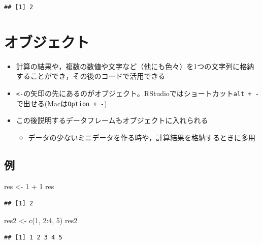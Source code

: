 \documentclass[
  xelatex,ja=standard, b5paper]{bxjsbook}
\newenvironment{Shaded}{\begin{snugshade}}{\end{snugshade}}
\newcommand{\DecValTok}[1]{\textcolor[rgb]{0.00,0.00,0.81}{#1}}
\newcommand{\FunctionTok}[1]{\textcolor[rgb]{0.00,0.00,0.00}{#1}}
\newcommand{\NormalTok}[1]{#1}
\newcommand{\OtherTok}[1]{\textcolor[rgb]{0.56,0.35,0.01}{#1}}
\newcommand{\SpecialCharTok}[1]{\textcolor[rgb]{0.00,0.00,0.00}{#1}}
\providecommand{\tightlist}{%
  \setlength{\itemsep}{0pt}\setlength{\parskip}{0pt}}
\begin{document}
\begin{verbatim}
## [1] 2
\end{verbatim}

\hypertarget{p-object}{%
\section{オブジェクト}\label{p-object}}

\begin{itemize}
\tightlist
\item
  計算の結果や，複数の数値や文字など（他にも色々）を1つの文字列に格納することができ，その後のコードで活用できる
\item
  \texttt{\textless{}-}の矢印の先にあるのがオブジェクト。RStudioではショートカット\texttt{alt\ +\ -}で出せる(Macは\texttt{Option\ +\ -})
\item
  この後説明するデータフレームもオブジェクトに入れられる

  \begin{itemize}
  \tightlist
  \item
    データの少ないミニデータを作る時や，計算結果を格納するときに多用
  \end{itemize}
\end{itemize}

\hypertarget{p-object-ex}{%
\subsection{例}\label{p-object-ex}}

\begin{Shaded}
\begin{Highlighting}[]
\NormalTok{res }\OtherTok{\textless{}{-}} \DecValTok{1} \SpecialCharTok{+} \DecValTok{1}
\NormalTok{res}
\end{Highlighting}
\end{Shaded}

\begin{verbatim}
## [1] 2
\end{verbatim}

\begin{Shaded}
\begin{Highlighting}[]
\NormalTok{res2 }\OtherTok{\textless{}{-}} \FunctionTok{c}\NormalTok{(}\DecValTok{1}\NormalTok{, }\DecValTok{2}\SpecialCharTok{:}\DecValTok{4}\NormalTok{, }\DecValTok{5}\NormalTok{)}
\NormalTok{res2}
\end{Highlighting}
\end{Shaded}

\begin{verbatim}
## [1] 1 2 3 4 5
\end{verbatim}
\end{document}

